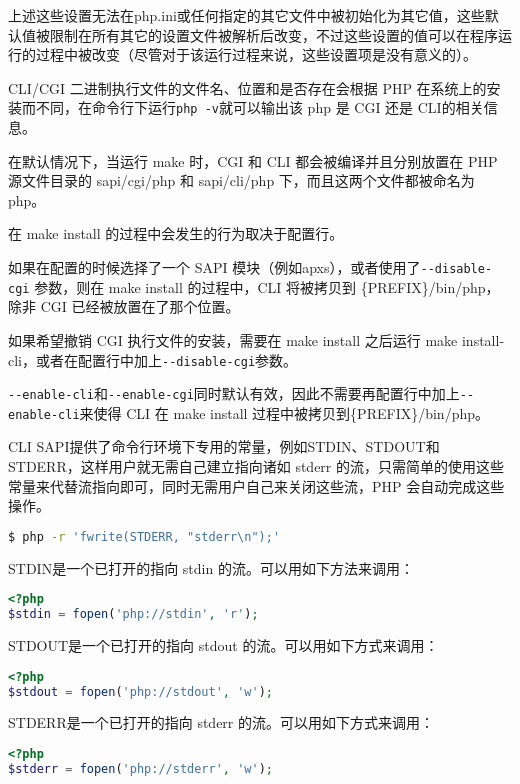 上述这些设置无法在php.ini或任何指定的其它文件中被初始化为其它值，这些默认值被限制在所有其它的设置文件被解析后改变，不过这些设置的值可以在程序运行的过程中被改变（尽管对于该运行过程来说，这些设置项是没有意义的）。



CLI/CGI 二进制执行文件的文件名、位置和是否存在会根据 PHP 在系统上的安装而不同，在命令行下运行\texttt{php -v}就可以输出该 php 是 CGI 还是 CLI的相关信息。

在默认情况下，当运行 make 时，CGI 和 CLI 都会被编译并且分别放置在 PHP 源文件目录的 sapi/cgi/php 和 sapi/cli/php 下，而且这两个文件都被命名为php。

在 make install 的过程中会发生的行为取决于配置行。

\begin{compactitem}
\item 如果在配置的时候选择了一个 SAPI 模块（例如apxs），或者使用了\texttt{-\/-disable-cgi} 参数，则在 make install 的过程中，CLI 将被拷贝到 \{PREFIX\}/bin/php，除非 CGI 已经被放置在了那个位置。
\item 如果希望撤销 CGI 执行文件的安装，需要在 make install 之后运行 make install-cli，或者在配置行中加上\texttt{-\/-disable-cgi}参数。
\end{compactitem}

\texttt{-\/-enable-cli}和\texttt{-\/-enable-cgi}同时默认有效，因此不需要再配置行中加上\texttt{-\/-enable-cli}来使得 CLI 在 make install 过程中被拷贝到\{PREFIX\}/bin/php。

CLI SAPI提供了命令行环境下专用的常量，例如STDIN、STDOUT和STDERR，这样用户就无需自己建立指向诸如 stderr 的流，只需简单的使用这些常量来代替流指向即可，同时无需用户自己来关闭这些流，PHP 会自动完成这些操作。

\begin{lstlisting}[language=bash]
$ php -r 'fwrite(STDERR, "stderr\n");'
\end{lstlisting}

\begin{compactitem}
\item STDIN是一个已打开的指向 stdin 的流。可以用如下方法来调用：

\begin{lstlisting}[language=PHP]
<?php
$stdin = fopen('php://stdin', 'r');
\end{lstlisting}

\item STDOUT是一个已打开的指向 stdout 的流。可以用如下方式来调用：

\begin{lstlisting}[language=PHP]
<?php
$stdout = fopen('php://stdout', 'w');
\end{lstlisting}

\item STDERR是一个已打开的指向 stderr 的流。可以用如下方式来调用：

\begin{lstlisting}[language=PHP]
<?php
$stderr = fopen('php://stderr', 'w');
\end{lstlisting}

\end{compactitem}


